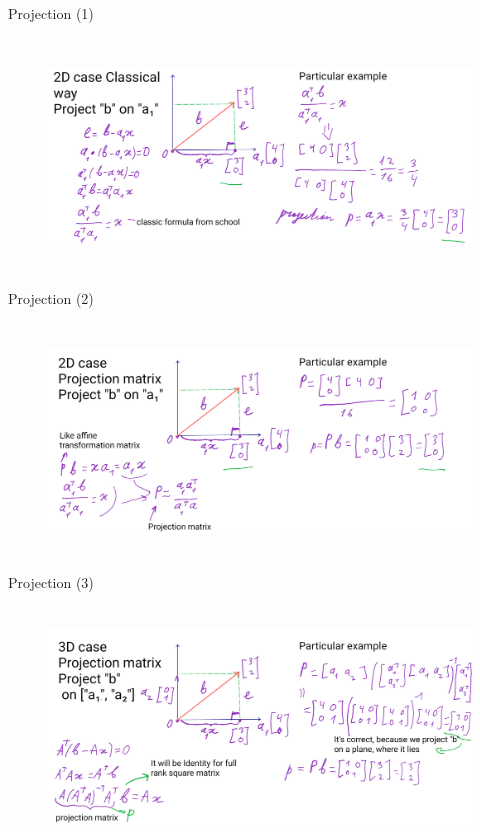 \documentclass[aspectratio=169]{beamer}
\begin{document}
\begin{frame}[t]{Projection (1)}
    \framesubtitle{}
    \begin{figure}[H]
        \centering\includegraphics[height=6cm,width=1\textwidth,keepaspectratio]{AGLA2_for_slides_1.png}
        \label{fig:AGLA2_for_slides_1.png}
    \end{figure}
\end{frame}

\begin{frame}[t]{Projection (2)}
    \framesubtitle{}
    \begin{figure}[H]
        \centering\includegraphics[height=6cm,width=1\textwidth,keepaspectratio]{AGLA2_for_slides_2.png}
        \label{fig:AGLA2_for_slides_2.png}
    \end{figure}
\end{frame}

\begin{frame}[t]{Projection (3)}
    \framesubtitle{}
    \begin{figure}[H]
        \centering\includegraphics[height=6cm,width=1\textwidth,keepaspectratio]{AGLA2_for_slides_3.png}
        \label{fig:AGLA2_for_slides_3.png}
    \end{figure}
\end{frame}
\end{document}
